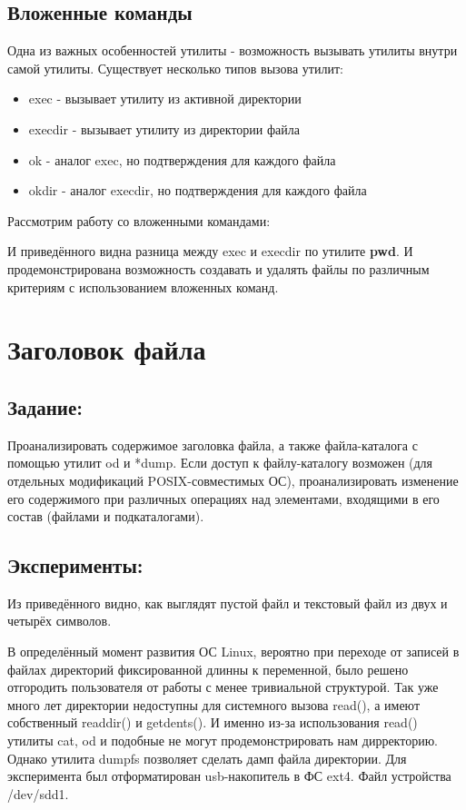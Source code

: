\documentclass[a4paper]{article}
\begin{document}
\subsection{Вложенные команды}
Одна из важных особенностей утилиты - возможность вызывать утилиты внутри самой утилиты. Существует несколько типов вызова утилит:
\begin{itemize}
\item exec - вызывает утилиту из активной директории
\item execdir - вызывает утилиту из директории файла
\item ok - аналог exec, но подтверждения для каждого файла
\item okdir - аналог execdir, но подтверждения для каждого файла
\end{itemize}
Рассмотрим работу со вложенными командами:

И приведённого видна разница между exec и execdir по утилите \textbf{pwd}. И продемонстрирована возможность создавать и удалять файлы по различным критериям с использованием вложенных команд.
\section{Заголовок файла} \subsection{Задание:}Проанализировать содержимое заголовка файла, а также файла-каталога с помощью утилит od  и  *dump. 
Если доступ к файлу-каталогу возможен (для отдельных модификаций POSIX-совместимых ОС), проанализировать изменение его содержимого при различных операциях над элементами, входящими в его состав (файлами и подкаталогами).  
\subsection{Эксперименты:}

Из приведённого видно, как выглядят пустой файл и текстовый файл из двух и четырёх символов.

В определённый момент развития ОС Linux, вероятно при переходе от записей в файлах директорий фиксированной длинны к переменной, было решено отгородить пользователя от работы с менее тривиальной структурой. Так уже много лет директории недоступны для системного вызова read(), а имеют собственный readdir() и getdents(). И именно из-за использования read() утилиты cat, od и подобные не могут продемонстрировать нам дирректорию. Однако утилита dumpfs позволяет сделать дамп файла директории. Для эксперимента был отформатирован usb-накопитель в ФС ext4. Файл устройства /dev/sdd1.\\
\end{document}
